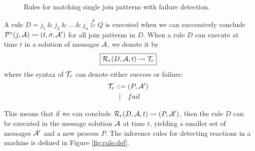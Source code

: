 \begin{figure}[!ht]
\caption{Rules for matching single join patterns with failure detection.\label{fig:rule:join}}
\end{figure}

A rule $D = j_1~\&~j_2~\&~...~\&~j_n \stackrel{d}{\triangleright}Q$ is
executed when we can successively conclude $\mathcal{P}^*(j,\mathcal{A}) \leadsto (t,
\sigma, \mathcal{A}')$ for all join patterns in $D$. When a rule $D$ can execute at time
$t$ in a solution of messages $\mathcal{A}$, we denote it by
\begin{equation*}
\boxed{\mathcal{R}_r(D,\mathcal{A},t) \leadsto \mathcal{T}_r}
\end{equation*}
where the syntax of $\mathcal{T}_r$ can denote either success or failure:
\begin{align*}
\mathcal{T}_r ::={}& (P,\mathcal{A}')\\
    |\quad& fail
\end{align*}

This means that if we can conclude $\mathcal{R}_r(D,\mathcal{A},t) \leadsto (P,\mathcal{A}')$, then the
rule $D$ can be executed in the message solution $\mathcal{A}$ at time $t$, yielding a
smaller set of messages $\mathcal{A}'$ and a new process $P$. The inference rules for
detecting reactions in a machine is defined in Figure \ref{fig:rule:def}.

